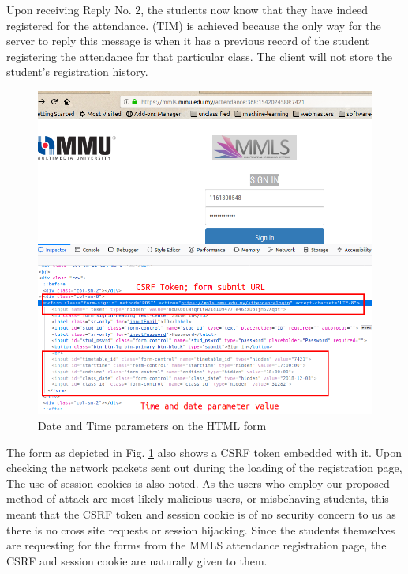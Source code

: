 \documentclass[runningheads]{llncs}
\begin{document}
Upon receiving Reply No. 2, the students now know that they have indeed registered for the attendance. (TIM) is achieved because the only way for the server to reply this message is when it has a previous record of the student registering the attendance for that particular class. The client will not store the student's registration history.

\begin{figure}
\includegraphics[width=\textwidth]{imgres/reg0_edit.png}
\caption{Date and Time parameters on the HTML form} 
\label{fig:reg0}
\centering
\end{figure}

The form as depicted in Fig. \ref{fig:reg0} also shows a CSRF token embedded with it. Upon checking the network packets sent out during the loading of the registration page, The use of session cookies is also noted. As the users who employ our proposed method of attack are most likely malicious users, or misbehaving students, this meant that the CSRF token and session cookie is of no security concern to us as there is no cross site requests or session hijacking. Since the students themselves are requesting for the forms from the MMLS attendance registration page, the CSRF and session cookie are naturally given to them.
\end{document}
